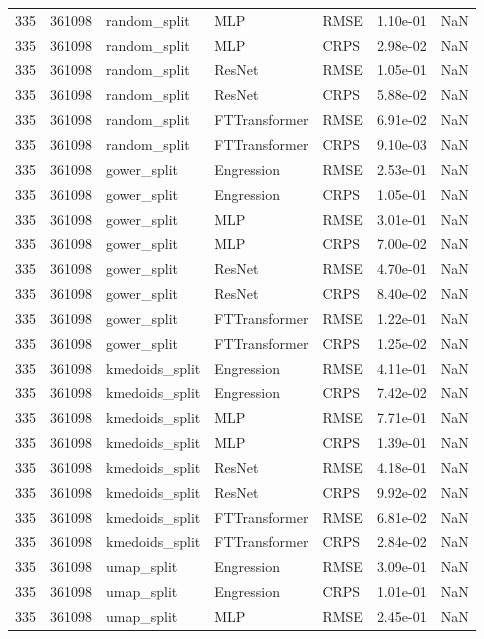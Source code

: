 \begin{tabular}{rrlllrr}
335 & 361098 & random\_split & MLP & RMSE & 1.10e-01 & NaN \\
335 & 361098 & random\_split & MLP & CRPS & 2.98e-02 & NaN \\
335 & 361098 & random\_split & ResNet & RMSE & 1.05e-01 & NaN \\
335 & 361098 & random\_split & ResNet & CRPS & 5.88e-02 & NaN \\
335 & 361098 & random\_split & FTTransformer & RMSE & 6.91e-02 & NaN \\
335 & 361098 & random\_split & FTTransformer & CRPS & 9.10e-03 & NaN \\
335 & 361098 & gower\_split & Engression & RMSE & 2.53e-01 & NaN \\
335 & 361098 & gower\_split & Engression & CRPS & 1.05e-01 & NaN \\
335 & 361098 & gower\_split & MLP & RMSE & 3.01e-01 & NaN \\
335 & 361098 & gower\_split & MLP & CRPS & 7.00e-02 & NaN \\
335 & 361098 & gower\_split & ResNet & RMSE & 4.70e-01 & NaN \\
335 & 361098 & gower\_split & ResNet & CRPS & 8.40e-02 & NaN \\
335 & 361098 & gower\_split & FTTransformer & RMSE & 1.22e-01 & NaN \\
335 & 361098 & gower\_split & FTTransformer & CRPS & 1.25e-02 & NaN \\
335 & 361098 & kmedoids\_split & Engression & RMSE & 4.11e-01 & NaN \\
335 & 361098 & kmedoids\_split & Engression & CRPS & 7.42e-02 & NaN \\
335 & 361098 & kmedoids\_split & MLP & RMSE & 7.71e-01 & NaN \\
335 & 361098 & kmedoids\_split & MLP & CRPS & 1.39e-01 & NaN \\
335 & 361098 & kmedoids\_split & ResNet & RMSE & 4.18e-01 & NaN \\
335 & 361098 & kmedoids\_split & ResNet & CRPS & 9.92e-02 & NaN \\
335 & 361098 & kmedoids\_split & FTTransformer & RMSE & 6.81e-02 & NaN \\
335 & 361098 & kmedoids\_split & FTTransformer & CRPS & 2.84e-02 & NaN \\
335 & 361098 & umap\_split & Engression & RMSE & 3.09e-01 & NaN \\
335 & 361098 & umap\_split & Engression & CRPS & 1.01e-01 & NaN \\
335 & 361098 & umap\_split & MLP & RMSE & 2.45e-01 & NaN \\

\end{tabular}
